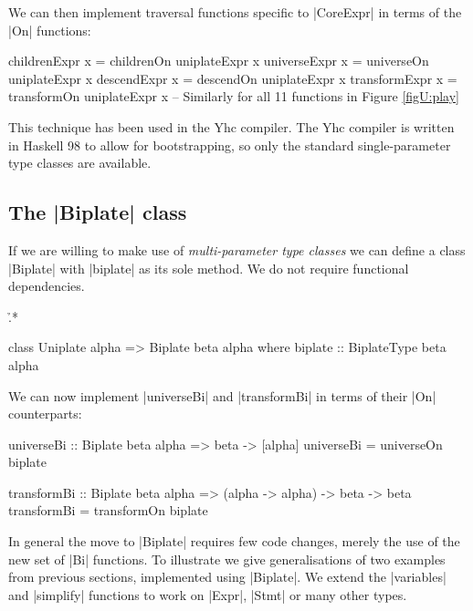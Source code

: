 \begin{example}

We can then implement traversal functions specific to |CoreExpr| in terms of the |On| functions:

\begin{code}
childrenExpr   x = childrenOn   uniplateExpr x
universeExpr   x = universeOn   uniplateExpr x
descendExpr    x = descendOn    uniplateExpr x
transformExpr  x = transformOn  uniplateExpr x
-- Similarly for all 11 functions in Figure \ref{figU:play}
\end{code}\codeexample
\end{example}
\bigskip

This technique has been used in the Yhc compiler. The Yhc compiler is written in Haskell 98 to allow for bootstrapping, so only the standard single-parameter type classes are available.

\subsection{The |Biplate| class}

If we are willing to make use of \textit{multi-parameter type classes} \cite{jones:mptc} we can define a class |Biplate| with |biplate| as its sole method. We do not require functional dependencies.

\h{.*}\begin{code}
class  Uniplate alpha => Biplate beta alpha where
       biplate :: BiplateType beta alpha
\end{code}

We can now implement |universeBi| and |transformBi| in terms of their |On| counterparts:

\begin{code}
universeBi :: Biplate beta alpha => beta -> [alpha]
universeBi = universeOn biplate

transformBi :: Biplate beta alpha => (alpha -> alpha) -> beta -> beta
transformBi = transformOn biplate
\end{code}

In general the move to |Biplate| requires few code changes, merely the use of the new set of |Bi| functions. To illustrate we give generalisations of two examples from previous sections, implemented using |Biplate|. We extend the |variables| and |simplify| functions to work on |Expr|, |Stmt| or many other types.

